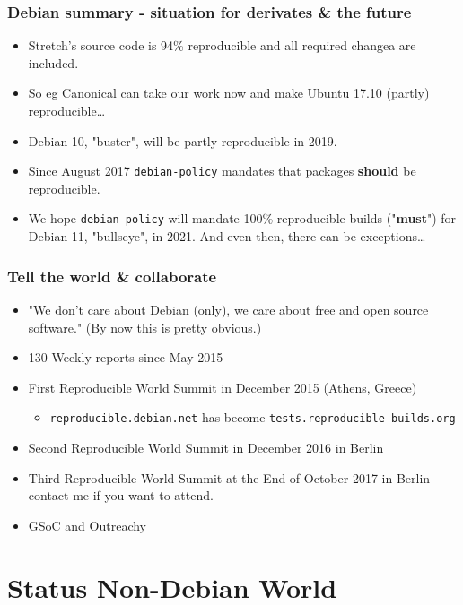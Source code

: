 \documentclass[14pt,aspectratio=169]{beamer}
\begin{document}
\begin{frame}
	\frametitle{Debian summary - situation for derivates \& the future}
 \begin{itemize}
  \item Stretch's source code is 94\% reproducible and all required changea are included.
  \item So eg Canonical can take our work now and make Ubuntu 17.10
  (partly) reproducible…
  \item<2-4> Debian 10, "buster", will be partly reproducible in 2019.
  \item<3-4> Since August 2017 \texttt{debian-policy} mandates that packages \textbf{should} be reproducible.
  \item<4> We hope \texttt{debian-policy} will mandate 100\%
	  reproducible builds ("\textbf{must}") for Debian 11, "bullseye", in 2021. And even then, there can be exceptions…
 \end{itemize}
\end{frame}

\begin{frame}
 \frametitle{Tell the world \& collaborate}

 \begin{itemize}
  \item "We don't care about Debian (only), we care about free and open
	  source software." (By now this is pretty obvious.)
  \item<2-4> 130 Weekly reports since May 2015
  \item<3-4> First Reproducible World Summit in December 2015 (Athens, Greece)
   \begin{itemize}
    \item<3-4> \texttt{reproducible.debian.net} has become \texttt{tests.reproducible-builds.org}
   \end{itemize}
    \item<3-4> Second Reproducible World Summit in December 2016 in Berlin
    \item<3-4> Third Reproducible World Summit at the End of October 2017 in Berlin - contact me if you want to attend.
   \item<4> GSoC and Outreachy
 \end{itemize}
\end{frame}



\section{Status Non-Debian World}
\end{document}
